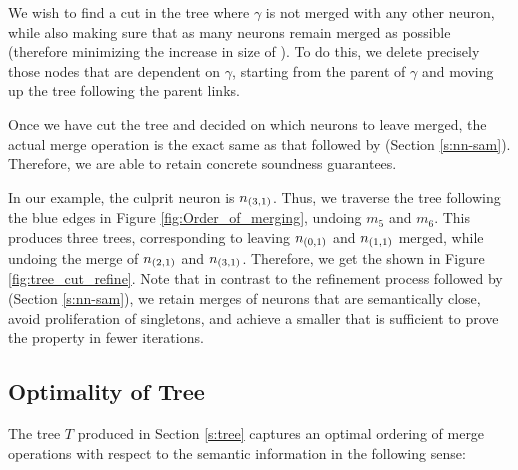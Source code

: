 We wish to find a cut in the tree where $\gamma$ is not merged with any other
neuron, while also making sure that as many neurons remain merged as possible
(therefore minimizing the increase in size of \abs). To do this, we delete
precisely those nodes that are dependent on $\gamma$, starting from the parent
of $\gamma$ and moving up the tree following the parent links.

Once we have cut the tree and decided on which neurons to leave merged, the
actual merge operation is the exact same as that followed by \cite{cegar-nn}
(Section \ref{s:nn-sam}). Therefore, we are able to retain concrete soundness
guarantees.

In our example, the culprit neuron is $n_{(3,1)}$. Thus, we traverse the tree
following the blue edges in Figure \ref{fig:Order_of_merging}, undoing $m_5$ and
$m_6$. This produces three trees, corresponding to leaving $n_{(0,1)}$ and
$n_{(1,1)}$ merged, while undoing the merge of $n_{(2,1)}$ and $n_{(3,1)}$.
Therefore, we get the \abs shown in Figure \ref{fig:tree_cut_refine}. Note
that in contrast to the refinement process followed by \cite{cegar-nn} (Section
\ref{s:nn-sam}), we retain merges of neurons that are semantically close, avoid
proliferation of singletons, and achieve a smaller \abs that is sufficient to
prove the property in fewer iterations.



\subsection{Optimality of Tree}
\label{s:optimal-tree}

The tree $T$ produced in Section \ref{s:tree} captures an optimal ordering of
merge operations with respect to the semantic information in the following
sense:

